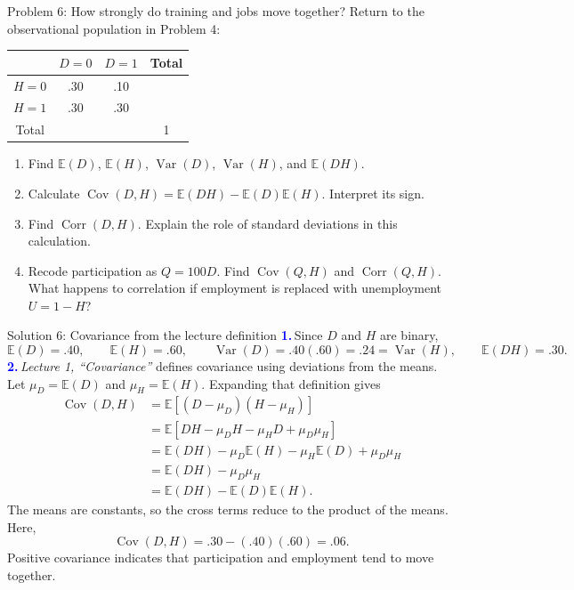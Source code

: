 \documentclass[notes,10pt, aspectratio=169]{beamer}
\newif\ifshowsolutions
\newcommand{\E}{\mathbb{E}}
\newcommand{\Var}{\operatorname{Var}}
\newcommand{\Cov}{\operatorname{Cov}}
\newcommand{\Corr}{\operatorname{Corr}}
\newcommand{\answerpart}[1]{\textcolor{blue}{\textbf{#1.}}\,}
\newcommand{\jobtable}{%
\begin{center}
\begin{tabular}{c|cc|c}
 & $D=0$ & $D=1$ & Total \\ \hline
$H=0$ & .30 & .10 & \\
$H=1$ & .30 & .30 & \\ \hline
Total & & & 1
\end{tabular}
\end{center}}
\begin{document}
\begin{frame}{Problem 6: How strongly do training and jobs move together?}
Return to the observational population in Problem 4:
\jobtable
\begin{enumerate}
\setlength{\itemsep}{7pt}
\item Find $\E(D)$, $\E(H)$, $\Var(D)$, $\Var(H)$, and $\E(DH)$.
\item Calculate $\Cov(D,H)=\E(DH)-\E(D)\E(H)$. Interpret its sign.
\item Find $\Corr(D,H)$. Explain the role of standard deviations in this calculation.
\item Recode participation as $Q=100D$. Find $\Cov(Q,H)$ and $\Corr(Q,H)$. What happens to correlation if employment is replaced with unemployment $U=1-H$?
\end{enumerate}
\end{frame}

\ifshowsolutions
\begin{frame}{Solution 6: Covariance from the lecture definition}
\small
\answerpart{1}Since $D$ and $H$ are binary,
\[
\E(D)=.40,\qquad \E(H)=.60,\qquad
\Var(D)=.40(.60)=.24=\Var(H),\qquad \E(DH)=.30.
\]
\answerpart{2}\textit{Lecture 1, ``Covariance''} defines covariance using deviations from the means. Let $\mu_D=\E(D)$ and $\mu_H=\E(H)$. Expanding that definition gives
\begin{align*}
\Cov(D,H)
&=\E[(D-\mu_D)(H-\mu_H)]\\
&=\E[DH-\mu_D H-\mu_H D+\mu_D\mu_H]\\
&=\E(DH)-\mu_D\E(H)-\mu_H\E(D)+\mu_D\mu_H\\
&=\E(DH)-\mu_D\mu_H\\
&=\E(DH)-\E(D)\E(H).
\end{align*}
The means are constants, so the cross terms reduce to the product of the means. Here,
\[
\Cov(D,H)=.30-(.40)(.60)=\boxed{.06}.
\]
Positive covariance indicates that participation and employment tend to move together.
\end{frame}
\end{document}
